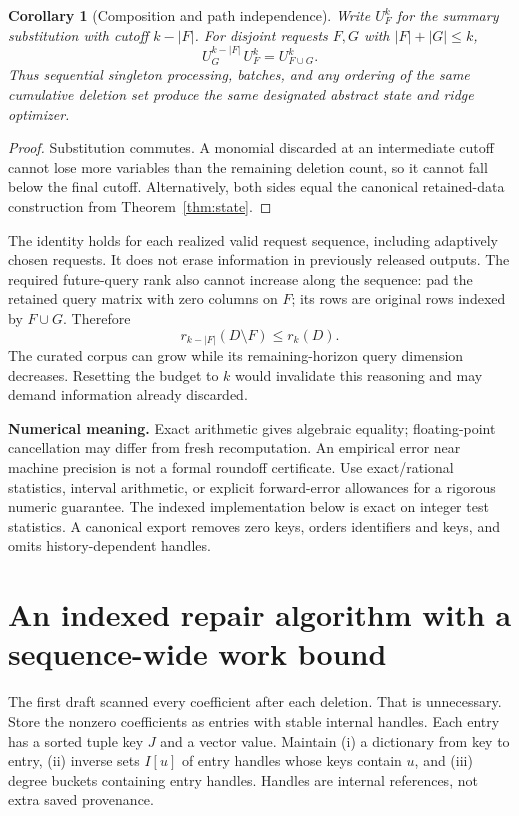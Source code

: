 \documentclass[11pt,a4paper]{article}
\newtheorem{corollary}[theorem]{Corollary}
\theoremstyle{definition}\newtheorem{definition}[theorem]{Definition}
\newcommand{\minus}{\setminus}
\begin{document}
\begin{corollary}[Composition and path independence]\label{cor:composition}
Write $U_F^k$ for the summary substitution with cutoff $k-|F|$. For disjoint requests $F,G$ with $|F|+|G|\le k$,
\[
 U_G^{k-|F|}\,U_F^k=U_{F\cup G}^k.
\]
Thus sequential singleton processing, batches, and any ordering of the same cumulative deletion set produce the same designated abstract state and ridge optimizer.
\end{corollary}
\begin{proof}
Substitution commutes. A monomial discarded at an intermediate cutoff cannot lose more variables than the remaining deletion count, so it cannot fall below the final cutoff. Alternatively, both sides equal the canonical retained-data construction from Theorem~\ref{thm:state}.
\end{proof}
The identity holds for each realized valid request sequence, including adaptively chosen requests. It does not erase information in previously released outputs. The required future-query rank also cannot increase along the sequence: pad the retained query matrix with zero columns on $F$; its rows are original rows indexed by $F\cup G$. Therefore
\[
 r_{k-|F|}(D\minus F)\le r_k(D).
\]
The curated corpus can grow while its remaining-horizon query dimension decreases. Resetting the budget to $k$ would invalidate this reasoning and may demand information already discarded.

\textbf{Numerical meaning.} Exact arithmetic gives algebraic equality; floating-point cancellation may differ from fresh recomputation. An empirical error near machine precision is not a formal roundoff certificate. Use exact/rational statistics, interval arithmetic, or explicit forward-error allowances for a rigorous numeric guarantee. The indexed implementation below is exact on integer test statistics. A canonical export removes zero keys, orders identifiers and keys, and omits history-dependent handles.

\section{An indexed repair algorithm with a sequence-wide work bound}\label{sec:indexed}
The first draft scanned every coefficient after each deletion. That is unnecessary. Store the nonzero coefficients as entries with stable internal handles. Each entry has a sorted tuple key $J$ and a vector value. Maintain (i) a dictionary from key to entry, (ii) inverse sets $I[u]$ of entry handles whose keys contain $u$, and (iii) degree buckets containing entry handles. Handles are internal references, not extra saved provenance.
\end{document}
